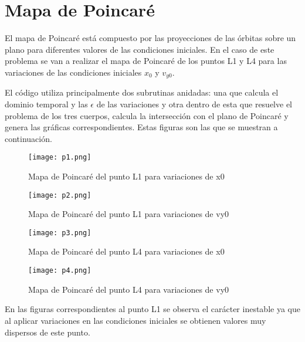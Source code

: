 \documentclass{article}
\begin{document}
	\section{Mapa de Poincaré}
	
	El mapa de Poincaré está compuesto por las proyecciones de las órbitas sobre un plano para diferentes valores de las condiciones iniciales. En el caso de este problema se van a realizar el mapa de Poincaré de los puntos L1 y L4 para las variaciones de las condiciones iniciales $x_0$ y $v_{y0}$.
	
	El código utiliza principalmente dos subrutinas anidadas: una que calcula el dominio temporal y las $\epsilon$ de las variaciones y otra dentro de esta que resuelve el problema de los tres cuerpos, calcula la intersección con el plano de Poincaré y genera las gráficas correspondientes. Estas figuras son las que se muestran a continuación.
	
	\begin{figure}[h!]
		\begin{center}
			\texttt{[image: p1.png]}
			\caption{Mapa de Poincaré del punto L1 para variaciones de x0}
		\end{center}
	\end{figure}

	\begin{figure}[h!]
		\begin{center}
			\texttt{[image: p2.png]}
			\caption{Mapa de Poincaré del punto L1 para variaciones de vy0}
		\end{center}
	\end{figure}

	\newpage

	\begin{figure}[h!]
		\begin{center}
			\texttt{[image: p3.png]}
			\caption{Mapa de Poincaré del punto L4 para variaciones de x0}
		\end{center}
	\end{figure}

	\begin{figure}[h!]
		\begin{center}
			\texttt{[image: p4.png]}
			\caption{Mapa de Poincaré del punto L4 para variaciones de vy0}
		\end{center}
	\end{figure}
	
	En las figuras correspondientes al punto L1 se observa el carácter inestable ya que al aplicar variaciones en las condiciones iniciales se obtienen valores muy dispersos de este punto.
	
\end{document}
